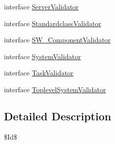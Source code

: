 \begin{DoxyCompactItemize}
\item 
interface \hyperlink{interfaceshootingmachineemfmodel_1_1validation_1_1_server_validator}{Server\-Validator}
\item 
interface \hyperlink{interfaceshootingmachineemfmodel_1_1validation_1_1_standardclass_validator}{Standardclass\-Validator}
\item 
interface \hyperlink{interfaceshootingmachineemfmodel_1_1validation_1_1_s_w___component_validator}{S\-W\-\_\-\-Component\-Validator}
\item 
interface \hyperlink{interfaceshootingmachineemfmodel_1_1validation_1_1_system_validator}{System\-Validator}
\item 
interface \hyperlink{interfaceshootingmachineemfmodel_1_1validation_1_1_task_validator}{Task\-Validator}
\item 
interface \hyperlink{interfaceshootingmachineemfmodel_1_1validation_1_1_toplevel_system_validator}{Toplevel\-System\-Validator}
\end{DoxyCompactItemize}


\subsection{Detailed Description}
\$\-Id\$ 